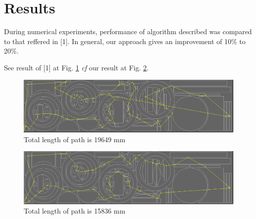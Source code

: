 \documentclass{../download/tPRS2e}
\begin{document}
\section{Results}

During numerical experiments,
performance of algorithm described
was compared to that reffered in [1].
In general, our approach gives an improvement of 10\% to 20\%.

See result of [1] at Fig. \ref{dynprog}
\textit{cf} our result at Fig. \ref{heuristics}.

\begin{figure}[]
    \includegraphics{mini-bad.png}
    \caption{Total length of path is 19649 mm}
    \label{dynprog}
\end{figure}

\begin{figure}[]
    \includegraphics{mini-good.png}
    \caption{Total length of path is 15836 mm}
    \label{heuristics}
\end{figure}
\end{document}
